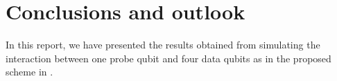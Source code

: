 \documentclass[%
 reprint,
 amsmath,amssymb,
 aps,
]{revtex4-1}
\begin{document}
\section{Conclusions and outlook }
In this report, we have presented the results obtained from simulating the interaction between one probe qubit and four data qubits as in the proposed scheme in \cite{the paper}. 

\end{document}
